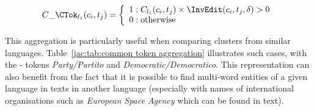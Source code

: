 \documentclass[output=paper]{langsci/langscibook}
\begin{document}
\begin{equation}
C\_\CTok_{l_{1}}(c_i,t_j) =
\left\{
  \begin{array}{lr}
    1 : C_{l_{1}}(c_i,t_j) \times \InvEdit(c_i,t_j,\delta) > 0\\
    0 : \text{otherwise}
  \end{array}
\right.
\end{equation}

This aggregation is particularly useful when comparing clusters from
similar languages. Table~\ref{jac:tab:common token aggregation}
illustrates such cases, with the - tokens
\textit{Party\slash Partito} and \textit{Democratic\slash Democratico}. This
representation can also benefit from the fact that it is possible to
find multi-word entities of a given language in texts in another
language (especially with names of international organisations such as
\textit{European Space Agency} which can be found in  text).



\label{jac:translated}

\end{document}
